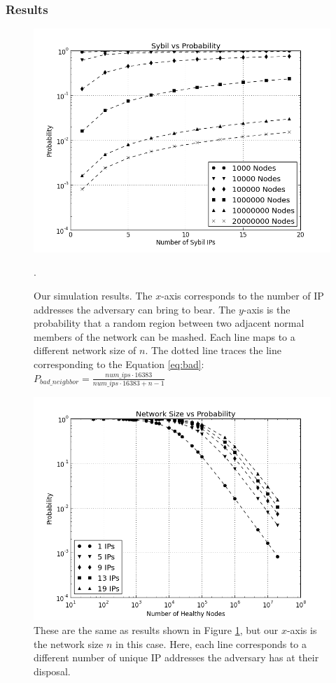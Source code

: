 \documentclass[11pt]{beamer}
\begin{document}
\subsubsection{Results}

\begin{frame}
    \begin{figure}
        \centering
        \includegraphics[width=0.65\linewidth]{figs/ip_prob_all}
        \caption[foo]{Our simulation results.  
            The $x$-axis corresponds to the number of IP addresses the adversary can bring to bear.
            The $y$-axis is the probability that a random region between two adjacent normal members of the network can be mashed.
            Each line maps to a different network size of $n$.
            The dotted line traces the line corresponding to the Equation \ref{eq:bad}: $ P_{bad\_neighbor} =  \frac{num\_ips \cdot 16383}{num\_ips \cdot 16383 + n - 1}$}.
        \label{fig:exp2}
    \end{figure}
\end{frame}

\begin{frame}
    
    \begin{figure}
        \centering
        \includegraphics[width=0.7\linewidth]{figs/size_prob_all}
        \caption[a]{These are the same as results shown in Figure \ref{fig:exp2}, but our $x$-axis is the network size $n$ in this case.  
            Here, each line corresponds to a different number of unique IP addresses the adversary has at their disposal.}
        \label{fig:size_prob_all}
    \end{figure}
\end{frame}
\end{document}
